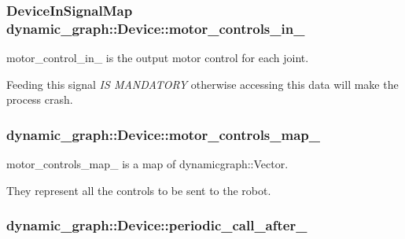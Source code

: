 \subsubsection[{\texorpdfstring{motor\+\_\+controls\+\_\+in\+\_\+}{motor_controls_in_}}]{\setlength{\rightskip}{0pt plus 5cm}Device\+In\+Signal\+Map dynamic\+\_\+graph\+::\+Device\+::motor\+\_\+controls\+\_\+in\+\_\+}\hypertarget{classdynamic__graph_1_1Device_a77f0617d7b53fb47d77af7557521daf4}{}\label{classdynamic__graph_1_1Device_a77f0617d7b53fb47d77af7557521daf4}


motor\+\_\+control\+\_\+in\+\_\+ is the output motor control for each joint. 

Feeding this signal {\itshape IS M\+A\+N\+D\+A\+T\+O\+RY} otherwise accessing this data will make the process crash. 
\subsubsection[{\texorpdfstring{motor\+\_\+controls\+\_\+map\+\_\+}{motor_controls_map_}}]{ dynamic\+\_\+graph\+::\+Device\+::motor\+\_\+controls\+\_\+map\+\_\+}\hypertarget{classdynamic__graph_1_1Device_a9d866a7e294a7445fb88dee8d8a80851}{}\label{classdynamic__graph_1_1Device_a9d866a7e294a7445fb88dee8d8a80851}


motor\+\_\+controls\+\_\+map\+\_\+ is a map of dynamicgraph\+::\+Vector. 

They represent all the controls to be sent to the robot. 
\subsubsection[{\texorpdfstring{periodic\+\_\+call\+\_\+after\+\_\+}{periodic_call_after_}}]{ dynamic\+\_\+graph\+::\+Device\+::periodic\+\_\+call\+\_\+after\+\_\+\hspace{0.3cm}{\ttfamily [protected]}}\hypertarget{classdynamic__graph_1_1Device_aa2ff18a40858856c9be43b2d609d63ab}{}\label{classdynamic__graph_1_1Device_aa2ff18a40858856c9be43b2d609d63ab}


